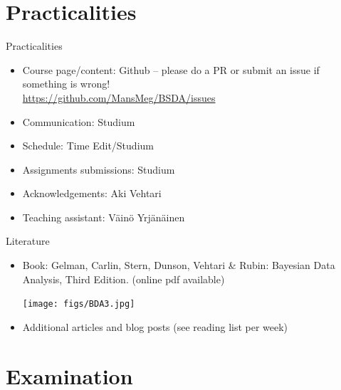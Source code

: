 \documentclass[10pt]{beamer}
\begin{document}
\section{Practicalities}
\frame{\sectionpage}

\begin{frame}{Practicalities}

\begin{itemize}
\item Course page/content: Github -- please do a PR or submit an issue if something is wrong!\\ \url{https://github.com/MansMeg/BSDA/issues}\pause
\item Communication: Studium\pause
\item Schedule: Time Edit/Studium
\item Assignments submissions: Studium\pause
\item Acknowledgements: Aki Vehtari\pause
\item Teaching assistant: Väinö Yrjänäinen
\end{itemize}

\end{frame}

\begin{frame}{Literature}

\begin{itemize}
  \item Book: Gelman, Carlin, Stern, Dunson, Vehtari \& Rubin: Bayesian Data Analysis, Third Edition. {\footnotesize (online pdf available)}
  \begin{center}
    \texttt{[image: figs/BDA3.jpg]}
  \end{center}
  \item Additional articles and blog posts (see reading list per week)
\end{itemize}

\end{frame}

\section{Examination}
\frame{\sectionpage}
\end{document}

